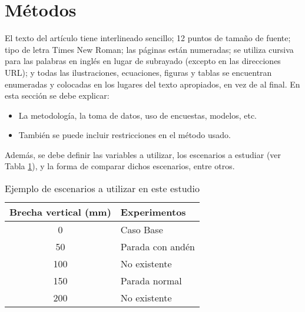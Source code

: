 \section{Métodos}
\label{sec:3}

El texto del artículo tiene interlineado sencillo; 12 puntos de tamaño de fuente; tipo de letra Times New Roman; las páginas están numeradas; se utiliza cursiva para las palabras en inglés en lugar de subrayado (excepto en las direcciones URL); y todas las ilustraciones, ecuaciones, figuras y tablas se encuentran enumeradas y colocadas en los lugares del texto apropiados, en vez de al final.
En esta sección se debe explicar:
\begin{itemize}
    \item La metodología, la toma de datos, uso de encuestas, modelos, etc. 
    \item También se puede incluir restricciones en el método usado. 
\end{itemize}


Además, se debe definir las variables a utilizar, los escenarios a estudiar (ver Tabla \ref{tab1}), y la forma de comparar dichos escenarios, entre otros.

\begin{table}
  \centering
  \begin{tabular}{cl}
    \toprule
      Brecha vertical (mm) & Experimentos\\
    \midrule
        0 & Caso Base             \\ 
        50 & Parada con andén     \\
        100 & No existente        \\
        150 & Parada normal       \\
        200 & No existente        \\
    \bottomrule
  \end{tabular}
  \caption{Ejemplo de escenarios a utilizar en este estudio}
  \label{tab1} %

\end{table}
